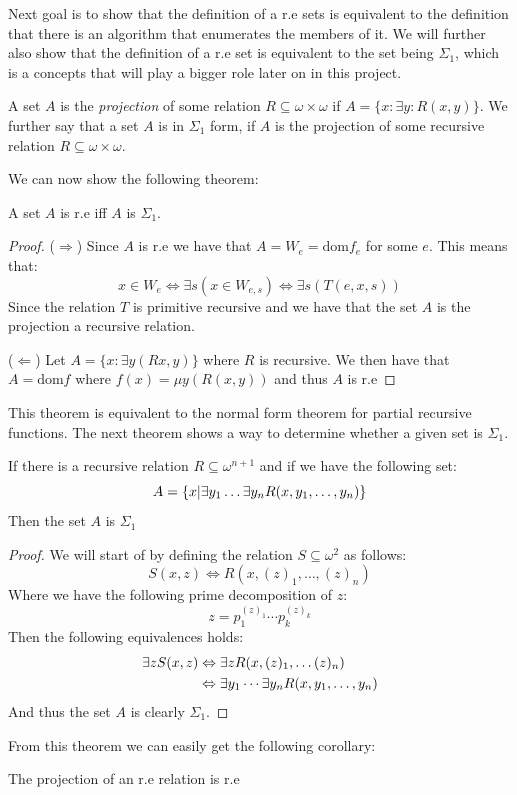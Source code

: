 \documentclass[../main.tex]{subfiles}
\begin{document}
Next goal is to show that the definition of a r.e sets is equivalent to the
definition that there is an algorithm that enumerates the members of it. We
will further also show that the definition of a r.e set is equivalent to the
set being $\Sigma_1$, which is a concepts that will play a bigger role later on
in this project.
\begin{defi}
	A set $A$ is the \textit{projection} of some relation $R\subseteq
	\omega\times\omega$ if $A=\{x:\exists y: R(x,y)\}$. We further say that
	a set $A$ is in $\Sigma_1$ form, if $A$ is the projection of some
	recursive relation $R\subseteq\omega\times\omega$.
\end{defi}
We can now show the following theorem:
\begin{thm}
	A set $A$ is r.e iff $A$ is $\Sigma_1$.
\end{thm}
\begin{proof}
	($\Rightarrow$) Since $A$ is r.e we have that $A=W_e=\text{dom} f_e$
	for some $e$. This means that:
	$$x\in W_e\Leftrightarrow\exists s(x\in W_{e,s})\Leftrightarrow \exists
	s(T(e,x,s))$$
	Since the relation $T$ is primitive recursive and we have that the set $A$
	is the projection a recursive relation.

	($\Leftarrow$) Let $A=\{x:\exists y(Rx,y)\}$ where $R$ is recursive. We
	then have that $A=\text{dom} f$ where $f(x)=\mu y(R(x,y))$ and thus $A$
	is r.e
\end{proof}
This theorem is equivalent to the normal form theorem for partial recursive
functions. The next theorem shows a way to determine whether a given set is
$\Sigma_1$.
\begin{thm}
	\label{thm:RecSigma}
	If there is a recursive relation $R\subseteq\omega^{n+1}$ and if we
	have the following set:
	$$A=\{x|\exists y_1\ldots\exists  y_n R(x,y_1,\ldots,y_n)\}$$
	Then the set $A$ is $\Sigma_1$
\end{thm}
\begin{proof}
	We will start of by defining the relation $S\subseteq\omega^2$ as
	follows:
	$$S(x,z)\Leftrightarrow R(x,(z)_1,\ldots,(z)_n)$$
	Where we have the following prime decomposition of $z$:
	$$z=p_1^{(z)_1}\cdots p_k^{(z)_k}$$
	Then the following equivalences holds:
	\begin{align*}
		\exists zS(x,z)&\Leftrightarrow \exists z R(x,(z)_1,\ldots
		(z)_n)\\
			       &\Leftrightarrow \exists y_1\cdots \exists y_n
			       R(x,y_1,\ldots,y_n)
	\end{align*}
	And thus the set $A$ is clearly $\Sigma_1$.
\end{proof}
From this theorem we can easily get the following corollary:
\begin{cor}
	The projection of an r.e relation is r.e
\end{cor}
\end{document}
